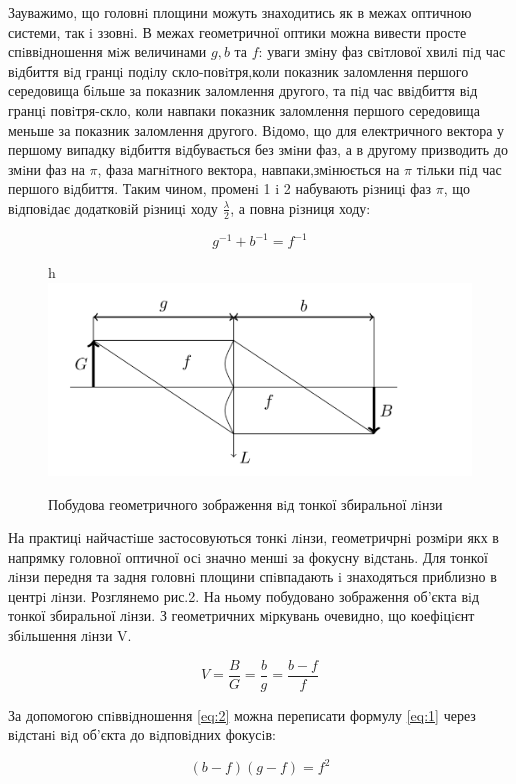 Зауважимо, що головнi площини можуть знаходитись як в межах оптичною системи, так i ззовнi. В
межах геометричної оптики можна вивести просте спiввiдношення мiж величинами $g, b$ та $f$: уваги змiну
фаз свiтлової хвилi пiд час вiдбиття вiд гранцi подiлу скло-повiтря,коли показник заломлення першого
середовища бiльше за показник заломлення другого, та пiд час ввiдбиття вiд гранцi повiтря-скло, коли
навпаки показник заломлення першого середовища меньше за показник заломлення другого. Вiдомо, що
для електричного вектора у першому випадку вiдбиття вiдбувається без змiни фаз, а в другому призводить
до змiни фаз на $\pi$, фаза магнiтного вектора, навпаки,змiнюється на $\pi$ тiльки пiд час першого вiдбиття.
Таким чином, променi 1 i 2 набувають рiзницi фаз $\pi$, що вiдповiдає додатковiй рiзницi ходу $\frac{\lambda}{2}$, а повна
рiзниця ходу:

\begin{equation} \label{eq:1}
    g^{-1} + b^{-1} = f^{-1}
\end{equation}


\begin{figure}{h}
    \centering    
    \includegraphics[width=.6\textwidth]{assets/2.png}       
    \caption{Побудова геометричного зображення вiд тонкої збиральної лiнзи}
\end{figure}

На практицi найчастiше застосовуються тонкi лiнзи, геометричрнi розмiри якх в напрямку головної
оптичної осi значно меншi за фокусну вiдстань. Для тонкої лiнзи передня та задня головнi площини
спiвпадають i знаходяться приблизно в центрi лiнзи. Розглянемо рис.2. На ньому побудовано зображення
об’єкта вiд тонкої збиральної лiнзи. З геометричних мiркувань очевидно, що коефiцiєнт збiльшення
лiнзи V.

\begin{equation} \label{eq:2}
    V = \frac{B}{G} = \frac{b}{g} = \frac{b-f}{f} 
\end{equation}

За допомогою спiввiдношення \ref{eq:2} можна переписати формулу \ref{eq:1}
через вiдстанi вiд об’єкта до вiдповiдних фокусiв:

\begin{equation} \label{eq:3}
    (b-f)(g-f) = f^2
\end{equation}